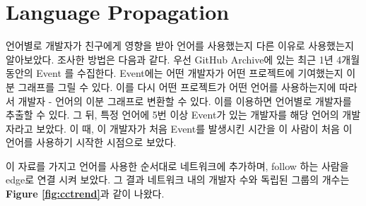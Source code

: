 \documentclass[10pt, a4paper, titlepage]{article}
\begin{document}
\FloatBarrier
\section{Language Propagation}

언어별로 개발자가 친구에게 영향을 받아 언어를 사용했는지 다른 이유로 사용했는지 알아보았다. 조사한 방법은 다음과 같다.
우선 GitHub Archive에 있는 최근 1년 4개월 동안의 Event 를 수집한다. Event에는 어떤 개발자가 어떤 프로젝트에 기여했는지 이분 그래프를 그릴 수 있다. 이를 다시 어떤 프로젝트가 어떤 언어를 사용하는지에 따라서 개발자 - 언어의 이분 그래프로 변환할 수 있다. 이를 이용하면 언어별로 개발자를 추출할 수 있다. 그 뒤, 특정 언어에 5번 이상 Event가 있는 개발자를 해당 언어의 개발자라고 보았다. 이 때, 이 개발자가 처음 Event를 발생시킨 시간을 이 사람이 처음 이 언어를 사용하기 시작한 시점으로 보았다.

이 자료를 가지고 언어를 사용한 순서대로 네트워크에 추가하며, follow 하는 사람을 edge로 연결 시켜 보았다. 그 결과 네트워크 내의 개발자 수와 독립된 그룹의 개수는 
{\bf Figure \ref{fig:cctrend}}과 같이 나왔다.
\end{document}
